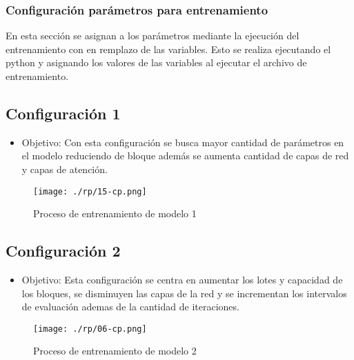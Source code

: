 
\subsubsection{Configuración parámetros para entrenamiento}\label{section:Configuración de los parámetros del código} 
En esta sección se asignan a los parámetros mediante la ejecución del entrenamiento con en remplazo de las variables. Esto se realiza ejecutando el python y asignando los valores de las variables al ejecutar el archivo de entrenamiento.
\subsection{Configuración 1}\label{section:Configuración de los parámetros del código} 
\begin{itemize}
	\item   Objetivo: Con esta configuración se busca mayor cantidad de parámetros en el modelo reduciendo de bloque además se aumenta cantidad de capas de red y capas de atención.
\end{itemize}
\begin{figure}[H]
	\centering %
	\texttt{[image: ./rp/15-cp.png]} 
	\caption{Proceso de entrenamiento de modelo 1\cite{}}
	\label{figure:Resultado 1}  %
\end{figure}
\subsection{Configuración 2}\label{section:Configuración de los parámetros del código} 
\begin{itemize}
	\item   Objetivo: Esta configuración se centra en aumentar los lotes y capacidad de los bloques, se disminuyen las capas de la red y se incrementan los intervalos de evaluación ademas de la cantidad de iteraciones.
\end{itemize}
\begin{figure}[H]
	\centering %
	\texttt{[image: ./rp/06-cp.png]} 
	\caption{Proceso de entrenamiento de modelo 2\cite{}}
	\label{figure:Resultado 1}  %
\end{figure}
\clearpage

